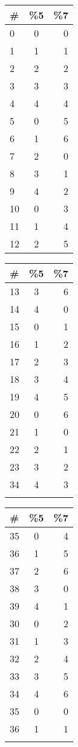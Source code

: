 \documentclass{article}
\begin{document}
\begin {tabular}{l || c | r}
\# & \%5 & \%7 \\ \hline
0 & 0 & 0 \\ \hline
1 & 1 & 1 \\ \hline
2 & 2 & 2 \\ \hline
3 & 3 & 3 \\ \hline
4 & 4 & 4 \\ \hline
5 & 0 & 5 \\ \hline
6 & 1 & 6 \\ \hline
7 & 2 & 0 \\ \hline
8 & 3 & 1 \\ \hline
9 & 4 & 2 \\ \hline
10 & 0 & 3 \\ \hline
11 & 1 & 4 \\ \hline
12 & 2 & 5 \\ \hline
\end{tabular}
\hspace{0.2in}
\begin{tabular}{l || c | r}
\# & \%5 & \%7 \\ \hline
13 & 3 & 6 \\ \hline
14 & 4 & 0 \\ \hline
15 & 0 & 1 \\ \hline
16 & 1 & 2 \\ \hline
17 & 2 & 3 \\ \hline
18 & 3 & 4 \\ \hline
19 & 4 & 5 \\ \hline
20 & 0 & 6 \\ \hline
21 & 1 & 0 \\ \hline
22 & 2 & 1 \\ \hline
23 & 3 & 2 \\ \hline
34 & 4 & 3 \\ \hline
\\
\end{tabular}
\hspace{0.2in}
\begin{tabular}{l || c | r}
\# & \%5 & \%7 \\ \hline
35 & 0 & 4 \\ \hline
36 & 1 & 5 \\ \hline
37 & 2 & 6 \\ \hline
38 & 3 & 0 \\ \hline
39 & 4 & 1 \\ \hline
30 & 0 & 2 \\ \hline
31 & 1 & 3 \\ \hline
32 & 2 & 4 \\ \hline
33 & 3 & 5 \\ \hline
34 & 4 & 6 \\ \hline
35 & 0 & 0 \\ \hline
36 & 1 & 1 \\ \hline
\\
\end{tabular}
\end{document}
